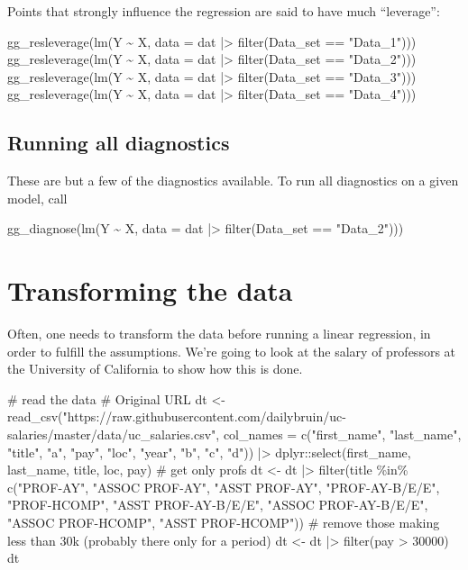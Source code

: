 \documentclass[
  letterpaper,
  DIV=11,
  numbers=noendperiod]{scrreprt}
\newenvironment{Shaded}{\begin{snugshade}}{\end{snugshade}}
\newcommand{\NormalTok}[1]{\textcolor[rgb]{0.00,0.23,0.31}{#1}}
\begin{document}
Points that strongly influence the regression are said to have much
``leverage'':

\begin{Shaded}
\begin{Highlighting}[]
\NormalTok{gg\_resleverage(lm(Y \textasciitilde{} X, data = dat |\textgreater{} filter(Data\_set == "Data\_1")))}
\NormalTok{gg\_resleverage(lm(Y \textasciitilde{} X, data = dat |\textgreater{} filter(Data\_set == "Data\_2")))}
\NormalTok{gg\_resleverage(lm(Y \textasciitilde{} X, data = dat |\textgreater{} filter(Data\_set == "Data\_3")))}
\NormalTok{gg\_resleverage(lm(Y \textasciitilde{} X, data = dat |\textgreater{} filter(Data\_set == "Data\_4")))}
\end{Highlighting}
\end{Shaded}

\subsection{Running all diagnostics}\label{running-all-diagnostics}

These are but a few of the diagnostics available. To run all diagnostics
on a given model, call

\begin{Shaded}
\begin{Highlighting}[]
\NormalTok{gg\_diagnose(lm(Y \textasciitilde{} X, data = dat |\textgreater{} filter(Data\_set == "Data\_2")))}
\end{Highlighting}
\end{Shaded}

\section{Transforming the data}\label{transforming-the-data}

Often, one needs to transform the data before running a linear
regression, in order to fulfill the assumptions. We're going to look at
the salary of professors at the University of California to show how
this is done.

\begin{Shaded}
\begin{Highlighting}[]
\NormalTok{\# read the data}
\NormalTok{\# Original URL}
\NormalTok{dt \textless{}{-} read\_csv("https://raw.githubusercontent.com/dailybruin/uc{-}salaries/master/data/uc\_salaries.csv", }
\NormalTok{               col\_names = c("first\_name", "last\_name", "title", "a", "pay", "loc", "year", "b", "c", "d")) |\textgreater{} }
\NormalTok{      dplyr::select(first\_name, last\_name, title, loc, pay)}
\NormalTok{\# get only profs}
\NormalTok{dt \textless{}{-} dt |\textgreater{} filter(title \%in\% c("PROF{-}AY", "ASSOC PROF{-}AY", "ASST PROF{-}AY", }
\NormalTok{                                 "PROF{-}AY{-}B/E/E", "PROF{-}HCOMP", "ASST PROF{-}AY{-}B/E/E", }
\NormalTok{                                 "ASSOC PROF{-}AY{-}B/E/E", "ASSOC PROF{-}HCOMP", "ASST PROF{-}HCOMP"))}
\NormalTok{\# remove those making less than 30k (probably there only for a period)}
\NormalTok{dt \textless{}{-} dt |\textgreater{} filter(pay \textgreater{} 30000)}
\NormalTok{dt}
\end{Highlighting}
\end{Shaded}
\end{document}
